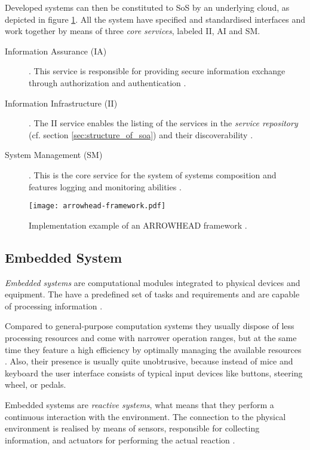 Developed systems can then be constituted to SoS by an underlying cloud, as depicted in figure \ref{fig:arrowhead-framework}. All the system have specified and standardised interfaces and work together by means of three \emph{core services}, labeled II, AI and SM.
\begin{description}
\item [Information Assurance (IA)] .
This service is responsible for providing secure information exchange through authorization and authentication \cite{arrowhead:presentation}.
\item [Information Infrastructure (II)] .
The II service enables the listing of the services in the \emph{service repository} (cf. section \ref{sec:structure_of_soa}) and their discoverability \cite{arrowhead:presentation}.
\item [System Management (SM)] .
This is the core service for the system of systems composition and features logging and monitoring abilities \cite{arrowhead:presentation}.
\end{description}

\begin{figure}[ht]
\centering
\texttt{[image: arrowhead-framework.pdf]}
\caption{Implementation example of an ARROWHEAD framework \cite{arrowhead:presentation}.}
\label{fig:arrowhead-framework}
\end{figure}

\subsection{Embedded System}
\label{sec:embedded_system}

\emph{Embedded systems} are computational modules integrated to physical devices and equipment. The have a predefined set of tasks and requirements and are capable of processing information \cite{rodrigues2011} \cite[p.xiii]{marwedel}. 

Compared to general-purpose computation systems they usually dispose of less processing resources and come with narrower operation ranges, but at the same time they feature a high efficiency by optimally managing the available resources \cite[p.283]{alippi} \cite[p.5]{marwedel}. Also, their presence is usually quite unobtrusive, because instead of mice and keyboard the user interface consists of typical input devices like buttons, steering wheel, or pedals.

Embedded systems are \emph{reactive systems}, what means that they perform a continuous interaction with the environment. The connection to the physical environment is realised by means of sensors, responsible for collecting information, and actuators for performing the actual reaction \cite[p.8-9]{marwedel}. 

